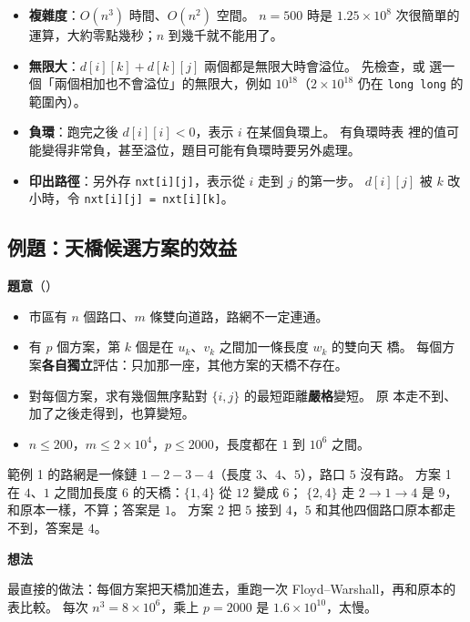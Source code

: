 \begin{itemize}
\item \textbf{複雜度}：$O(n^3)$ 時間、$O(n^2)$ 空間。 $n = 500$ 時是
$1.25 \times 10^8$ 次很簡單的運算，大約零點幾秒；$n$ 到幾千就不能用了。
\item \textbf{無限大}：$d[i][k] + d[k][j]$ 兩個都是無限大時會溢位。 先檢查，或
選一個「兩個相加也不會溢位」的無限大，例如 $10^{18}$（$2 \times 10^{18}$ 仍在
\texttt{long long} 的範圍內）。
\item \textbf{負環}：跑完之後 $d[i][i] < 0$，表示 $i$ 在某個負環上。 有負環時表
裡的值可能變得非常負，甚至溢位，題目可能有負環時要另外處理。
\item \textbf{印出路徑}：另外存 \texttt{nxt[i][j]}，表示從 $i$ 走到 $j$ 的第一步。
$d[i][j]$ 被 $k$ 改小時，令 \texttt{nxt[i][j] = nxt[i][k]}。
\end{itemize}

\subsection{例題：天橋候選方案的效益}
\label{sec:ex-footbridge}

\textbf{題意}（）

\begin{itemize}
\item 市區有 $n$ 個路口、$m$ 條雙向道路，路網不一定連通。
\item 有 $p$ 個方案，第 $k$ 個是在 $u_k$、$v_k$ 之間加一條長度 $w_k$ 的雙向天
橋。 每個方案\textbf{各自獨立}評估：只加那一座，其他方案的天橋不存在。
\item 對每個方案，求有幾個無序點對 $\{i, j\}$ 的最短距離\textbf{嚴格}變短。 原
本走不到、加了之後走得到，也算變短。
\item $n \le 200$，$m \le 2 \times 10^4$，$p \le 2000$，長度都在 $1$ 到 $10^6$
之間。
\end{itemize}

範例 1 的路網是一條鏈 $1 - 2 - 3 - 4$（長度 $3$、$4$、$5$），路口 $5$ 沒有路。
方案 1 在 $4$、$1$ 之間加長度 $6$ 的天橋：$\{1, 4\}$ 從 $12$ 變成 $6$；
$\{2, 4\}$ 走 $2 \to 1 \to 4$ 是 $9$，和原本一樣，不算；答案是 $1$。 方案 2 把
$5$ 接到 $4$，$5$ 和其他四個路口原本都走不到，答案是 $4$。

\textbf{想法}

最直接的做法：每個方案把天橋加進去，重跑一次 Floyd--Warshall，再和原本的表比較。
每次 $n^3 = 8 \times 10^6$，乘上 $p = 2000$ 是 $1.6 \times 10^{10}$，太慢。

